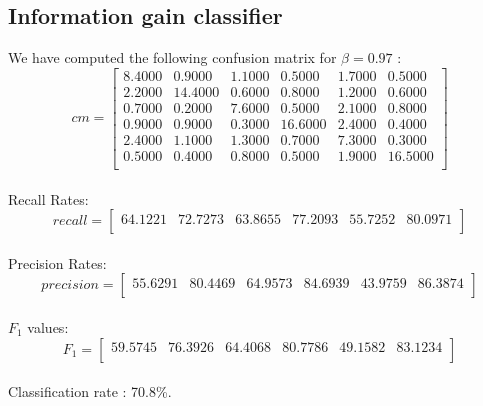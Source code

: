 \documentclass[a4paper,12pt,oneside,final]{report}
\begin{document}
\begin{appendices}
\subsection{Information gain classifier}
We have computed the following confusion matrix for $\beta=0.97$ :
\[
cm = \left[\begin{array}{cccccc}
    8.4000  &  0.9000  &  1.1000  &  0.5000  &  1.7000  &  0.5000 \\
    2.2000  & 14.4000  &  0.6000  &  0.8000  &  1.2000  &  0.6000 \\
    0.7000  &  0.2000  &  7.6000  &  0.5000  &  2.1000  &  0.8000 \\
    0.9000  &  0.9000  &  0.3000  & 16.6000  &  2.4000  &  0.4000 \\
    2.4000  &  1.1000  &  1.3000  &  0.7000  &  7.3000  &  0.3000 \\
    0.5000  &  0.4000  &  0.8000  &  0.5000  &  1.9000  & 16.5000 \\
\end{array}
\right]
\]
\paragraph{}
Recall Rates:
\[
recall = \left[\begin{array}{cccccc}
 64.1221 &  72.7273 &  63.8655 &  77.2093 &  55.7252 &  80.0971\\
\end{array}
\right]
\]
\paragraph{}
Precision Rates:
\[
precision = \left[\begin{array}{cccccc}
55.6291  & 80.4469 &  64.9573  & 84.6939 &  43.9759 &  86.3874 \\
\end{array}
\right]
\]
\paragraph{}
$F_{1}$ values: 
\[
F_{1} = \left[\begin{array}{cccccc}
59.5745  & 76.3926  & 64.4068  & 80.7786 &  49.1582 &  83.1234 \\
\end{array}
\right]
\]
\paragraph{}
Classification rate : 70.8\%.

\end{appendices}
\end{document}
